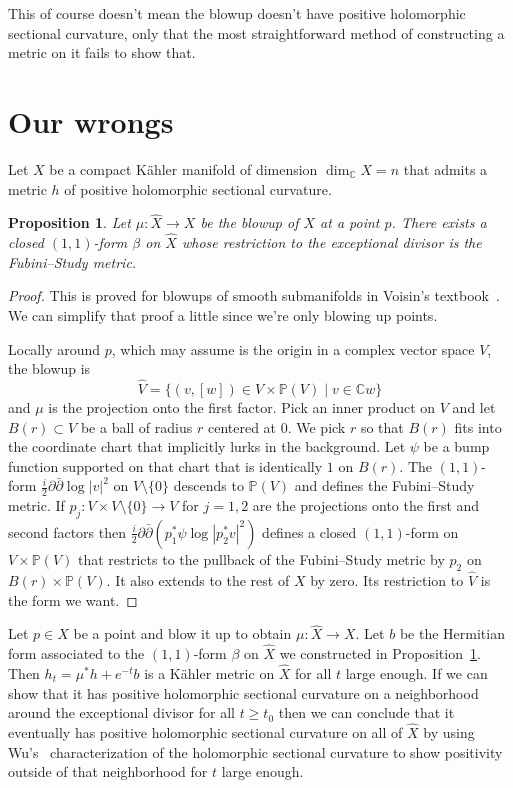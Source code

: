 \documentclass[10pt,a4paper]{amsart}
\newtheorem{prop}[theo]{Proposition}
\newcommand{\kk}[1]{\mathbb{#1}}
\def\hsc{holomorphic sectional curvature}
\def\bl#1{\widehat{#1}}
\def\blX{\bl{X}}
\begin{document}
This of course doesn't mean the blowup doesn't have positive \hsc{}, only that
the most straightforward method of constructing a metric on it fails to show that.




\section{Our wrongs}

Let $X$ be a compact K\"ahler manifold of dimension $\dim_{\kk C} X = n$ that
admits a metric $h$ of positive \hsc.



\begin{prop}
\label{prop:fs}
Let $\mu : \bl X \to X$ be the blowup of $X$ at a point $p$.
There exists a closed $(1,1)$-form $\beta$ on $\blX$ whose restriction to
the exceptional divisor is the Fubini--Study metric.
\end{prop}

\begin{proof}
This is proved for blowups of smooth submanifolds in
Voisin's textbook~\cite{voisin2002theorie}. We can simplify that proof a little
since we're only blowing up points.

Locally around $p$, which may assume is the origin in a complex vector space
$V$, the blowup is
$$
\bl V
= \{ (v,[w]) \in V \times \kk P(V) \mid v \in \kk C w \}
$$
and $\mu$ is the projection onto the first factor.
Pick an inner product on $V$ and let $B(r) \subset V$ be a ball of radius $r$
centered at $0$.
We pick $r$ so that $B(r)$ fits into the coordinate chart that implicitly lurks
in the background.
Let $\psi$ be a bump function supported on that chart that is identically $1$
on $B(r)$.
The $(1,1)$-form $\frac i2 \partial\bar\partial \log |v|^2$ on $V \setminus
\{0\}$ descends to $\kk P(V)$ and defines the Fubini--Study metric.
If $p_j : V \times V \setminus \{0\} \to V$ for $j = 1,2$ are the projections
onto the first and second factors then
$\frac i2 \partial \bar\partial (p_1^*\psi \log |p_2^*v|^2)$
defines a closed $(1,1)$-form on $V \times \kk P(V)$ that restricts to the
pullback of the Fubini--Study metric by $p_2$ on $B(r) \times \kk P(V)$.
It also extends to the rest of $X$ by zero.
Its restriction to $\bl V$ is the form we want.
\end{proof}




Let $p \in X$ be a point and blow it up to obtain $\mu : \bl X \to X$.
Let $b$ be the Hermitian form associated to the $(1,1)$-form $\beta$ on $\bl X$
we constructed in Proposition~\ref{prop:fs}.
Then $h_t = \mu^*h + e^{-t} b$ is a K\"ahler metric on $\bl X$ for all $t$ large
enough.
If we can show that it has positive \hsc{} on a neighborhood around the
exceptional divisor for all $t \geq t_0$ then we can conclude that it eventually
has positive \hsc{} on all of $\blX$ by using Wu's~\cite{wu1973remark}
characterization of the \hsc{} to show positivity outside of that neighborhood
for $t$ large enough.
\end{document}
